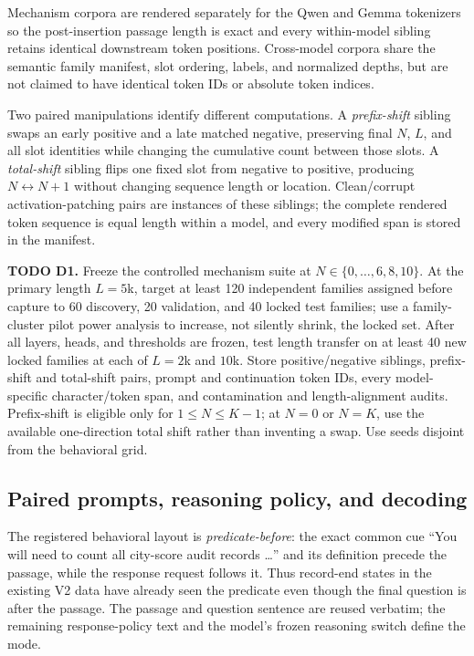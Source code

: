 \documentclass[10pt,twocolumn]{article}
\newcommand{\todoid}[2]{%
  \par\noindent\textcolor{red!75!black}{\textbf{TODO #1.} #2}\par}
\begin{document}
Mechanism corpora are rendered separately for the Qwen and Gemma tokenizers so the
post-insertion passage length is exact and every within-model sibling retains identical
downstream token positions. Cross-model corpora share the semantic family manifest, slot
ordering, labels, and normalized depths, but are not claimed to have identical token IDs or
absolute token indices.

Two paired manipulations identify different computations. A \emph{prefix-shift} sibling swaps
an early positive and a late matched negative, preserving final $N$, $L$, and all slot
identities while changing the cumulative count between those slots. A \emph{total-shift}
sibling flips one fixed slot from negative to positive, producing $N\leftrightarrow N+1$
without changing sequence length or location. Clean/corrupt activation-patching pairs are
instances of these siblings; the complete rendered token sequence is equal length within a
model, and every modified span is stored in the manifest.

\todoid{D1}{Freeze the controlled mechanism suite at
  $N\in\{0,\ldots,6,8,10\}$. At the primary length $L=5$k, target at least 120 independent
  families assigned before capture to 60 discovery, 20 validation, and 40 locked test families;
  use a family-cluster pilot power analysis to increase, not silently shrink, the locked set.
  After all layers, heads, and thresholds are frozen, test length transfer on at least 40 new
  locked families at each of $L=2$k and $10$k. Store positive/negative siblings, prefix-shift and
  total-shift pairs, prompt and continuation token IDs, every model-specific character/token
  span, and contamination and length-alignment audits. Prefix-shift is eligible only for
  $1\leq N\leq K-1$; at $N=0$ or $N=K$, use the available one-direction total shift rather than
  inventing a swap. Use seeds disjoint from the behavioral grid.}

\subsection{Paired prompts, reasoning policy, and decoding}
The registered behavioral layout is \emph{predicate-before}: the exact common cue
``You will need to count all city-score audit records \ldots'' and its definition precede the
passage, while the response request follows it. Thus
record-end states in the existing V2 data have already seen the predicate even though the final
question is after the passage. The passage and question sentence are reused verbatim; the
remaining response-policy text and the model's frozen reasoning switch define the mode.
\end{document}
